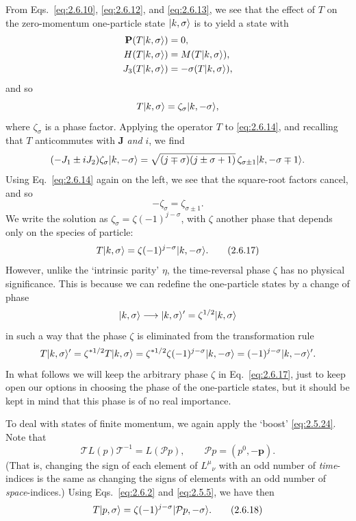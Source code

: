 From Eqs.~\eqref{eq:2.6.10}, \eqref{eq:2.6.12}, and \eqref{eq:2.6.13}, we see that the effect of $T$ on
the zero-momentum one-particle state $\lvert k,\sigma\rangle$ is to yield a state with
\[
\begin{aligned}
\mathbf{P}(T\lvert k,\sigma\rangle)&=0,\\
H(T\lvert k,\sigma\rangle)&=M(T\lvert k,\sigma\rangle),\\
J_3(T\lvert k,\sigma\rangle)&=-\sigma(T\lvert k,\sigma\rangle),
\end{aligned}
\]
and so
\[
T\lvert k,\sigma\rangle=\zeta_\sigma\lvert k,-\sigma\rangle,
\]
where $\zeta_\sigma$ is a phase factor. Applying the operator $T$ to
\eqref{eq:2.6.14}, and recalling that $T$ anticommutes with $\mathbf{J}$ \emph{and}
$i$, we find
\[
(-J_1\mathbin{\pm}iJ_2)\zeta_\sigma\lvert k,-\sigma\rangle
=\sqrt{(j\mp\sigma)(j\pm\sigma+1)}\,
 \zeta_{\sigma\pm1}\lvert k,-\sigma\mp1\rangle.
\]
Using Eq.~\eqref{eq:2.6.14} again on the left, we see that the square-root factors
cancel, and so
\[
-\zeta_\sigma=\zeta_{\sigma\pm1}.
\]
We write the solution as $\zeta_\sigma=\zeta(-1)^{j-\sigma}$, with $\zeta$
another phase that depends only on the species of particle:
\begin{equation}
T\lvert k,\sigma\rangle=\zeta(-1)^{j-\sigma}\lvert k,-\sigma\rangle.
\tag{2.6.17}\label{eq:2.6.17}
\end{equation}
However, unlike the `intrinsic parity' $\eta$, the time-reversal phase $\zeta$
has no physical significance. This is because we can redefine the
one-particle states by a change of phase
\[
\lvert k,\sigma\rangle\longrightarrow
\lvert k,\sigma\rangle'=\zeta^{1/2}\lvert k,\sigma\rangle
\]
in such a way that the phase $\zeta$ is eliminated from the transformation
rule
\[
T\lvert k,\sigma\rangle'
=\zeta^{*1/2}T\lvert k,\sigma\rangle
=\zeta^{*1/2}\zeta(-1)^{j-\sigma}\lvert k,-\sigma\rangle
=(-1)^{j-\sigma}\lvert k,-\sigma\rangle'.
\]
In what follows we will keep the arbitrary phase $\zeta$ in Eq.~\eqref{eq:2.6.17},
just to keep open our options in choosing the phase of the one-particle states,
but it should be kept in mind that this phase is of no real importance.

To deal with states of finite momentum, we again apply the `boost' \eqref{eq:2.5.24}.
Note that
\[
\mathcal{T}L(p)\mathcal{T}^{-1}=L(\mathcal{P}p),
\qquad
\mathcal{P}p=(p^0,-\mathbf{p}).
\]
(That is, changing the sign of each element of $L^\mu{}_{\nu}$ with an odd
number of \emph{time}-indices is the same as changing the signs of elements
with an odd number of \emph{space}-indices.) Using Eqs.~\eqref{eq:2.6.2} and \eqref{eq:2.5.5},
we have then
\begin{equation}
T\lvert p,\sigma\rangle
=\zeta(-1)^{j-\sigma}\lvert \mathcal{P}p,-\sigma\rangle.
\tag{2.6.18}\label{eq:2.6.18}
\end{equation}


